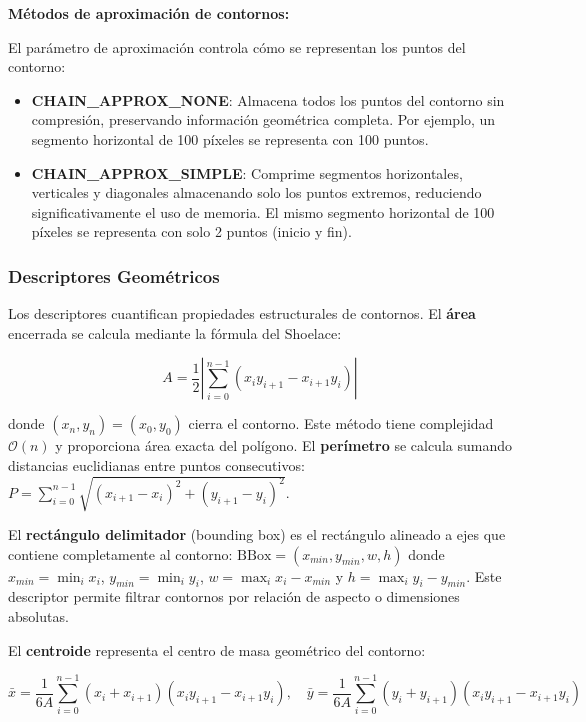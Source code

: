 \textbf{Métodos de aproximación de contornos:}

El parámetro de aproximación controla cómo se representan los puntos del contorno:

\begin{itemize}
\item \textbf{CHAIN\_APPROX\_NONE}: Almacena todos los puntos del contorno sin compresión, preservando información geométrica completa. Por ejemplo, un segmento horizontal de 100 píxeles se representa con 100 puntos.

\item \textbf{CHAIN\_APPROX\_SIMPLE}: Comprime segmentos horizontales, verticales y diagonales almacenando solo los puntos extremos, reduciendo significativamente el uso de memoria. El mismo segmento horizontal de 100 píxeles se representa con solo 2 puntos (inicio y fin).
\end{itemize}

\subsubsection{Descriptores Geométricos}

Los descriptores cuantifican propiedades estructurales de contornos. El \textbf{área} encerrada se calcula mediante la fórmula del Shoelace:

\begin{equation}
A = \frac{1}{2}\left|\sum_{i=0}^{n-1}(x_i y_{i+1} - x_{i+1}y_i)\right|
\end{equation}

donde $(x_n, y_n) = (x_0, y_0)$ cierra el contorno. Este método tiene complejidad $\mathcal{O}(n)$ y proporciona área exacta del polígono. El \textbf{perímetro} se calcula sumando distancias euclidianas entre puntos consecutivos: $P = \sum_{i=0}^{n-1}\sqrt{(x_{i+1}-x_i)^2 + (y_{i+1}-y_i)^2}$.

El \textbf{rectángulo delimitador} (bounding box) es el rectángulo alineado a ejes que contiene completamente al contorno: $\text{BBox} = (x_{min}, y_{min}, w, h)$ donde $x_{min} = \min_i x_i$, $y_{min} = \min_i y_i$, $w = \max_i x_i - x_{min}$ y $h = \max_i y_i - y_{min}$. Este descriptor permite filtrar contornos por relación de aspecto o dimensiones absolutas.

El \textbf{centroide} representa el centro de masa geométrico del contorno:

\begin{equation}
\bar{x} = \frac{1}{6A}\sum_{i=0}^{n-1}(x_i + x_{i+1})(x_i y_{i+1} - x_{i+1}y_i), \quad \bar{y} = \frac{1}{6A}\sum_{i=0}^{n-1}(y_i + y_{i+1})(x_i y_{i+1} - x_{i+1}y_i)
\end{equation}

